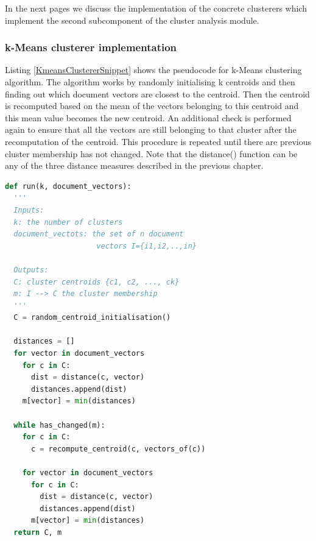 \noindent In the next pages we discuss the implementation of the concrete clusterers which implement the second subcomponent of the cluster analysis module.

\subsubsection{k-Means clusterer implementation}
Listing \ref{KmeansClustererSnippet} shows the pseudocode for k-Means clustering algorithm. The algorithm works by randomly initialising k centroids and then finding out which document vectors are closest to the centroid. Then the centroid is recomputed based on the mean of the vectors belonging to this centroid and this mean value becomes the new centroid. An additional check is performed again to ensure that all the vectors are still belonging to that cluster after the recomputation of the centroid. This procedure is repeated until there are previous cluster membership has not changed. Note that the distance() function can be any of the three distance measures described in the previous chapter.

\begin{lstlisting}[language=Python, label=KmeansClustererSnippet, caption=Pseudocode for k-Means algorithm]
def run(k, document_vectors):
  '''
  Inputs: 
  k: the number of clusters
  document_vectots: the set of n document 
                     vectors I={i1,i2,..,in}
  
  Outputs:
  C: cluster centroids {c1, c2, ..., ck}
  m: I --> C the cluster membership
  '''
  C = random_centroid_initialisation()
  
  distances = []
  for vector in document_vectors
    for c in C:
      dist = distance(c, vector)
      distances.append(dist)
    m[vector] = min(distances)

  while has_changed(m):
    for c in C:
      c = recompute_centroid(c, vectors_of(c))   
    
    for vector in document_vectors
      for c in C:
        dist = distance(c, vector)  
        distances.append(dist)
      m[vector] = min(distances)
  return C, m

\end{lstlisting}

